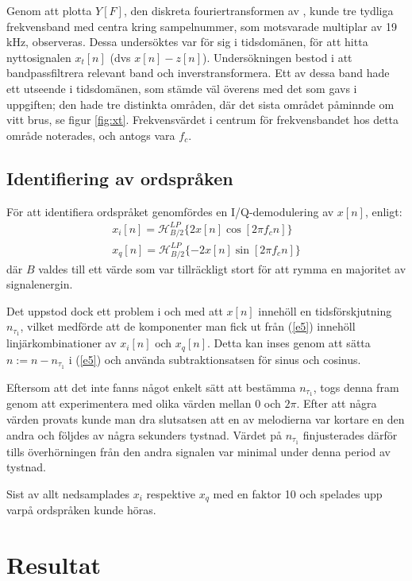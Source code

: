 \documentclass[10pt,twocolumn,a4paper]{article}
\begin{document}
Genom att plotta $Y[F]$, den diskreta fouriertransformen av \yhat, kunde tre tydliga frekvensband med
centra kring sampelnummer, som motsvarade multiplar av 19 kHz, observeras.
Dessa undersöktes var för sig i tidsdomänen, för att hitta nyttosignalen $x_t[n]$ (dvs $x[n] - z[n]$).
Undersökningen bestod i att bandpassfiltrera relevant band och inverstransformera. Ett av
dessa band hade ett utseende i tidsdomänen, som stämde väl överens med det som gavs i uppgiften; den
hade tre distinkta områden, där det sista området påminnde om vitt brus, se figur \ref{fig:xt}.
Frekvensvärdet i centrum för frekvensbandet hos detta område noterades, och antogs vara $f_c$.

\subsection{Identifiering av ordspråken}

För att identifiera ordspråket genomfördes en I/Q-demodulering av $x[n]$, enligt:
\begin{multline}
    x_i[n] = \mathcal{H}_{B/2}^{LP} \{ 2 x[n] \cos[2 \pi f_c n] \} \\
    x_q[n] = \mathcal{H}_{B/2}^{LP} \{ -2 x[n] \sin[2 \pi f_c n] \}
    \label{e5}
\end{multline}
där $B$ valdes till ett värde som var tillräckligt stort för att rymma en majoritet
av signalenergin.

Det uppstod dock ett problem i och med att $x[n]$ innehöll en tidsförskjutning $n_{\tau_1}$,
vilket medförde att de komponenter man fick ut från (\ref{e5}) innehöll
linjärkombinationer av $x_i[n]$ och $x_q[n]$. Detta kan inses genom att sätta $n := n - n_{\tau_1}$
i (\ref{e5}) och använda subtraktionsatsen för sinus och cosinus.

Eftersom att det inte fanns något enkelt sätt att bestämma $n_{\tau_1}$, togs denna fram genom
att experimentera med olika värden mellan $0$ och $2 \pi$. Efter att några värden provats
kunde man dra slutsatsen att en av melodierna var kortare en den andra och följdes av några
sekunders tystnad. Värdet på $n_{\tau_1}$ finjusterades därför tills överhörningen från den
andra signalen var minimal under denna period av tystnad.

Sist av allt nedsamplades $x_i$ respektive $x_q$ med en faktor 10 och spelades upp varpå
ordspråken kunde höras.
\section{Resultat}
\end{document}

